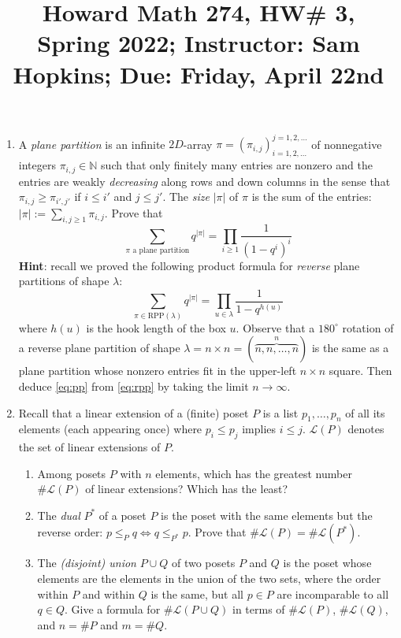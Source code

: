 \documentclass[11pt]{article}
\title{Howard Math 274, HW\# 3, \\ {\normalsize Spring 2022; Instructor: Sam Hopkins; Due: Friday, April 22nd}}
\date{}
\begin{document}
\maketitle

\thispagestyle{empty}

\vspace{-2cm}

\begin{enumerate}

\item A \emph{plane partition} is an infinite $2D$-array $\pi = (\pi_{i,j})_{i=1,2,\ldots}^{j=1,2,\ldots}$ of nonnegative integers $\pi_{i,j} \in \mathbb{N}$ such that only finitely many entries are nonzero and the entries are weakly \emph{decreasing} along rows and down columns in the sense that $\pi_{i,j} \geq \pi_{i',j'}$ if $i \leq i'$ and $j \leq j'$. The \emph{size} $|\pi|$ of $\pi$ is the sum of the entries: $|\pi| :=\sum_{i,j \geq 1} \pi_{i,j}$. Prove that 
\begin{equation} \label{eq:pp} \sum_{\textrm{$\pi$ a plane partition}} q^{|\pi|} = \prod_{i \geq 1} \frac{1}{(1-q^i)^i} \end{equation}
{\bf Hint}: recall we proved the following product formula for \emph{reverse} plane partitions of shape $\lambda$:
\begin{equation} \label{eq:rpp} \sum_{\pi \in \mathrm{RPP}(\lambda)} q^{|\pi|} = \prod_{u \in \lambda} \frac{1}{1-q^{h(u)}} \end{equation}
where $h(u)$ is the hook length of the box $u$. Observe that a $180^\circ$ rotation of a reverse plane partition of shape $\lambda = n \times n = (\overbrace{n,n,\ldots,n}^{n})$ is the same as a plane partition whose nonzero entries fit in the upper-left $n\times n$ square. Then deduce \eqref{eq:pp} from \eqref{eq:rpp} by taking the limit $n\to \infty$.

\item Recall that a linear extension of a (finite) poset $P$ is a list $p_1,\ldots,p_n$ of all its elements (each appearing once) where $p_i \leq p_j$ implies $i \leq j$. $\mathcal{L}(P)$ denotes the set of linear extensions of $P$.
\begin{enumerate}
\item Among posets $P$ with $n$ elements, which has the greatest number $\#\mathcal{L}(P)$ of linear extensions? Which has the least?
\item The \emph{dual} $P^{*}$ of a poset $P$ is the poset with the same elements but the reverse order: $p \leq_{P} q \Leftrightarrow q \leq_{P^*} p$. Prove that $\#\mathcal{L}(P)=\#\mathcal{L}(P^*)$.
\item The \emph{(disjoint) union} $P \cup Q$ of two posets $P$ and $Q$ is the poset whose elements are the elements in the union of the two sets, where the order within $P$ and within $Q$ is the same, but all $p \in P$ are incomparable to all $q\in Q$. Give a formula for $\#\mathcal{L}(P\cup Q)$ in terms of $\#\mathcal{L}(P)$, $\#\mathcal{L}(Q)$, and $n = \#P$ and $m = \#Q$.
\end{enumerate}


\end{enumerate}
\end{document}
